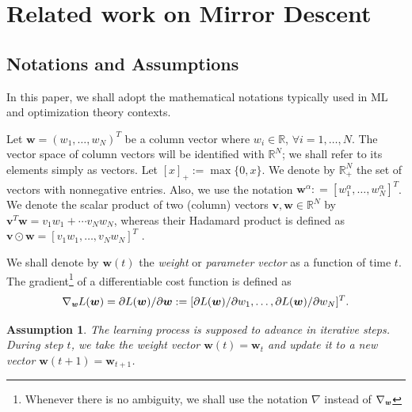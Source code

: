 \documentclass[10pt]{amsart}
\newtheorem{assumption}{Assumption}
\newcommand{\bi}[1]{\textbf{\textit{#1}}}
\newcommand{\bv}{\boldsymbol{v}}
\newcommand{\bw}{\boldsymbol{w}}
\theoremstyle{definition}
\theoremstyle{definition}	 %
\begin{document}
 \section{Related work on Mirror Descent}\label{Sec3}


 \subsection{Notations and Assumptions} In this paper, we shall adopt the mathematical notations typically used in ML and optimization theory contexts.


 Let $\bw=(w_1,\ldots,w_N)^{T}$ be a column vector  where $w_i\in \mathbb{R}$, $\forall i=1,\dots, N$. The vector space of column vectors will be identified with $\mathbb{R}^{N}$; we shall refer to its elements simply as vectors. Let $[x]_+ := \max\{0,x\}$. We denote by $\mathbb{R}^N_+$ the set of vectors with nonnegative entries. Also, we use the notation $\bw^{\alpha}: = [w_1^{\alpha}, \ldots, w_N^{\alpha}]^T$. We denote the scalar product of two (column) vectors $\bv, \bw\in \mathbb{R}^N$  by  $\bv^{T}\bw=v_1 w_1+\cdots v_N w_N$, whereas their Hadamard product is defined as $\bv \odot \bw = [ v_1w_1, \ldots, v_Nw_N ]^T$ .


 We shall  denote by $\bw (t)$ the \textit{weight} or \textit{parameter vector} as a function of time $t$.  The gradient\footnote{Whenever there is no ambiguity, we shall use the notation $\nabla$ instead of $\nabla_{\bi w}$} of a differentiable cost function is defined as
 \[
  \nabla_{\bi w} L(\bw) = \partial L(\bw)/\partial \bw: = [\partial L(\bw)/\partial w_1, \ldots, \partial L(\bw)/\partial w_N]^T .
  \]


\begin{assumption}
The learning process is supposed to advance in iterative steps. During step $t$,  we take the weight vector $\bw (t) = \bw_t$ and update it to a new vector $\bw(t+1) = \bw_{t+1}$.
\end{assumption}
\end{document}
